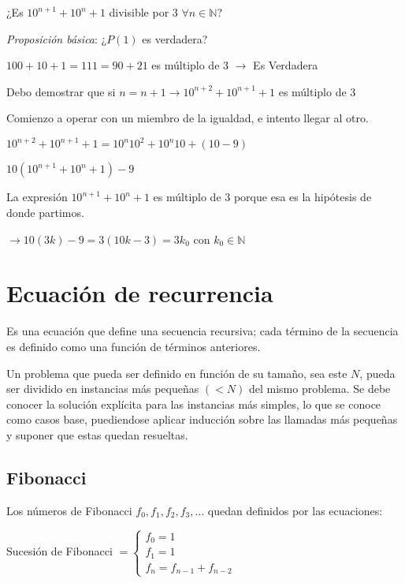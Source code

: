 \documentclass[a4paper, twoside]{article}
\begin{document}
	\vspace{0.25cm}
	¿Es $10^{n+1}+10^{n}+1$ divisible por 3 $\forall n \in \mathbb{N}$?
	
	\emph{Proposición básica}: ¿$P(1)$ es verdadera?
	\vspace{0.25cm}
	
	$100+10+1=111=90+21 $ es múltiplo de 3 $\rightarrow$ Es Verdadera
	
	Debo demostrar que si $n=n+1 \rightarrow 10^{n+2}+10^{n+1}+1$ es múltiplo de 3
	
	\vspace{0.25cm}
	Comienzo a operar con un miembro de la igualdad, e intento llegar al otro.
	
	\vspace{0.25cm}
	$10^{n+2}+10^{n+1}+1=10^{n}10^{2}+10^{n}10+(10-9)$
	
	\vspace{0.25cm}
	$10(10^{n+1}+10^{n}+1)-9$
	
	\vspace{0.25cm}
	La expresión $10^{n+1}+10^{n}+1$ es múltiplo de 3 porque esa es la hipótesis de donde partimos.
	
	$\rightarrow 10 (3k) - 9 = 3 (10k -3) = 3k_0$ con $k_0 \in \mathbb{N}$

\newpage
\section{Ecuación de recurrencia}
	Es una ecuación que define una secuencia recursiva; cada término de la secuencia es definido como una función de términos anteriores.
	
	Un problema que pueda ser definido en función de su tamaño, sea este $N$, pueda ser dividido en instancias más pequeñas $(< N)$ del mismo problema.
	Se debe conocer la solución explícita para las instancias más simples, lo que se conoce como casos base, puediendose aplicar inducción sobre las llamadas más pequeñas y suponer que estas quedan resueltas.
	\subsection{Fibonacci}
	Los números de Fibonacci $f_0,f_1,f_2,f_3,\dots$  quedan definidos por las ecuaciones:
	\vspace{0.5cm}
	
	\begin{center}	
		Sucesión de Fibonacci $= \left\{ \begin{array}{c}
		f_0 = 1\\
		f_1 = 1\\
		f_n = f_{n-1} + f_{n-2}
		\end{array}\right.$
	\end{center}
\end{document}
